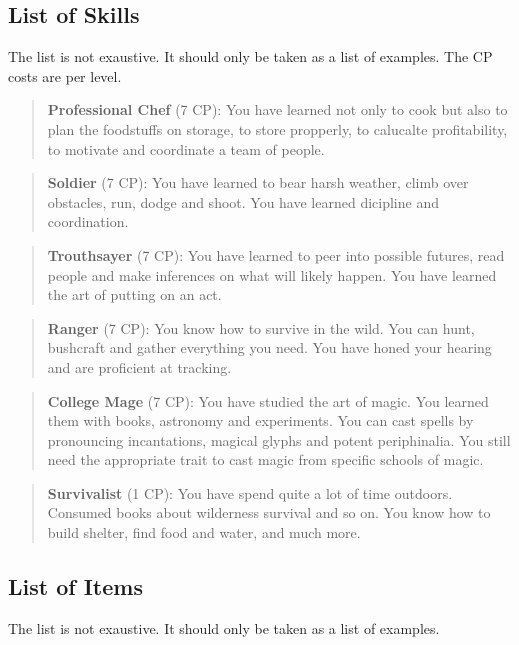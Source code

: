 \documentclass[11pt]{article}
\begin{document}
{\begin{multicols}{2}[]
\subsection{List of Skills}
\label{sec:orgbc18f3a}
The list is not exaustive. It should only be taken as a list of examples. The CP costs are per level.

\begin{quote}
\textbf{Professional Chef} (7 CP): You have learned not only to cook but also to plan the foodstuffs on storage, to store propperly, to calucalte profitability, to motivate and coordinate a team of people.
\end{quote}

\begin{quote}
\textbf{Soldier} (7 CP): You have learned to bear harsh weather, climb over obstacles, run, dodge and shoot. You have learned dicipline and coordination.
\end{quote}

\begin{quote}
\textbf{Trouthsayer} (7 CP): You have learned to peer into possible futures, read people and make inferences on what will likely happen. You have learned the art of putting on an act. 
\end{quote}

\begin{quote}
\textbf{Ranger} (7 CP): You know how to survive in the wild. You can hunt, bushcraft and gather everything you need. You have honed your hearing and are proficient at tracking.
\end{quote}

\begin{quote}
\textbf{College Mage} (7 CP): You have studied the art of magic. You learned them with books, astronomy and experiments. You can cast spells by pronouncing incantations, magical glyphs and potent periphinalia. You still need the appropriate trait to cast magic from specific schools of magic.
\end{quote}

\begin{quote}
\textbf{Survivalist} (1 CP): You have spend quite a lot of time outdoors. Consumed books about wilderness survival and so on. You know how to build shelter, find food and water, and much more. 
\end{quote}


\subsection{List of Items}
\label{sec:org886eea3}
The list is not exaustive. It should only be taken as a list of examples.


\end{multicols}}
\end{document}
